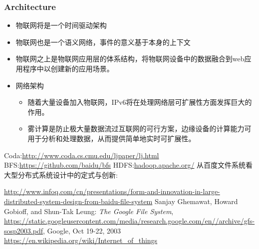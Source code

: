\documentclass{ctexart}
\begin{document}
\subsubsection{Architecture}
\begin{itemize}
	\item 物联网将是一个时间驱动架构
	\item 物联网也是一个语义网络，事件的意义基于本身的上下文
	\item 物联网之上是物联网应用层的体系结构，将物联网设备中的数据融合到web应用程序中以创建新的应用场景。
	\item 网络架构
	\begin{itemize}
		\item 随着大量设备加入物联网，IPv6将在处理网络层可扩展性方面发挥巨大的作用。
		\item 雾计算是防止极大量数据流过互联网的可行方案，边缘设备的计算能力可用于分析和处理数据，从而提供简单地实时可扩展性。
	\end{itemize}
\end{itemize}
\begin{thebibliography}{3}
	Coda:\url{http://www.coda.cs.cmu.edu/ljpaper/lj.html}
	BFS:\url{https://github.com/baidu/bfs}
	HDFS:\url{hadoop.apache.org/}
	从百度文件系统看大型分布式系统设计中的定式与创新:

	\url{http://www.infoq.com/cn/presentations/form-and-innovation-in-large-distributed-system-design-from-baidu-file-system}
	Sanjay Ghemawat, Howard Gobioff, and Shun-Tak Leung: \textit{The Google File System}, \url{https://static.googleusercontent.com/media/research.google.com/en//archive/gfs-sosp2003.pdf}, Google, Oct 19-22, 2003
	\url{https://en.wikipedia.org/wiki/Internet_of_things}
\end{thebibliography}
\end{document}
